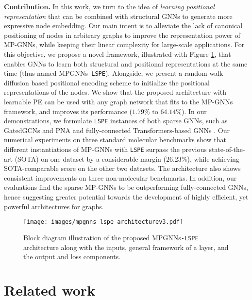 \documentclass{article} \usepackage{iclr2021_conference,times}
\begin{document}
{\bf Contribution.} In this work, we turn to the idea of {\it learning positional representation} that can be combined with structural GNNs to generate more expressive node embedding. Our main intent is to alleviate the lack of canonical positioning of nodes in arbitrary graphs to improve the representation power of MP-GNNs, while keeping their linear complexity for large-scale applications.
For this objective, we propose a novel framework, illustrated with Figure \ref{fig:mpgnns_lspe_architecture}, that enables GNNs to learn both structural and positional representations at the same time (thus named MPGNNs\texttt{-LSPE}).
Alongside, we present a random-walk diffusion based positional encoding scheme to initialize the positional representations of the nodes.
We show that the proposed architecture with learnable PE can be used with any graph network that fits to the MP-GNNs framework, 
and improves its performance 
($1.79\%$
to $64.14\%$).
In our demonstrations, we formulate \texttt{LSPE} instances of both sparse GNNs, such as GatedGCNs \citep{bresson2017residual} and PNA \citep{corso2020principal} and fully-connected Transformers-based GNNs \citep{kreuzer2021rethinking, mialon2021graphit}.
Our numerical experiments on three standard molecular benchmarks show that different instantiations of MP-GNNs with \texttt{LSPE} surpass the previous state-of-the-art (SOTA) on one dataset by a considerable margin 
($26.23\%$), while achieving SOTA-comparable score on 
the other two datasets.
The architecture also shows consistent improvements on three non-molecular benchmarks. In addition, our evaluations find the sparse MP-GNNs to be outperforming fully-connected GNNs, hence suggesting greater potential towards the development of highly efficient, yet powerful architectures for graphs.

\begin{figure}[!t]
    \centering
    \texttt{[image: images/mpgnns\_lspe\_architecturev3.pdf]}
    \vspace{-3pt}
    \caption{Block diagram illustration of the proposed MPGNNs\texttt{-LSPE} architecture along with the inputs, general framework of a layer, and the output and loss components.}
    \label{fig:mpgnns_lspe_architecture}
    \vspace{-9pt}
\end{figure}


\section{Related work}
\label{sec:related_work}
\end{document}
